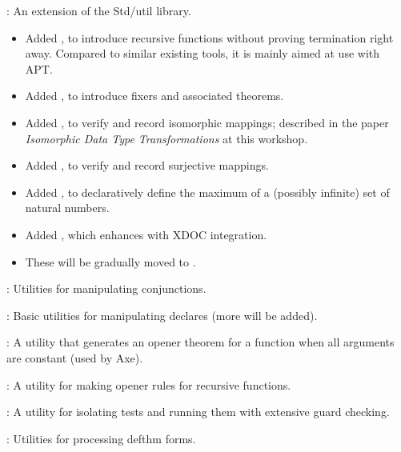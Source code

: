 
\begin{frame}

\newlibtitle

:
An extension of the Std/util library.
\begin{itemize}
\item
Added ,
to introduce recursive functions without proving termination right away.
Compared to similar existing tools, it is mainly aimed at use with APT.
\item
Added , to introduce fixers and associated theorems.
\item
Added , to verify and record isomorphic mappings;
described in the paper
\textit{Isomorphic Data Type Transformations} at this workshop.
\item
Added , to verify and record surjective mappings.
\item
Added ,
to declaratively define the maximum of
a (possibly infinite) set of natural numbers.
\item
Added , which enhances  with XDOC integration.
\item
These will be gradually moved to .
\end{itemize}

\end{frame}


\begin{frame}

\newlibtitle

:
Utilities for manipulating conjunctions.

\separation

:
Basic utilities for manipulating declares (more will be added).

\separation

:
A utility that generates an opener theorem for a function when all arguments are constant (used by Axe).

\separation

:
A utility for making opener rules for recursive functions.

\separation

:
A utility for isolating tests and running them with extensive guard checking.

\separation

:
Utilities for processing defthm forms.

\end{frame}

